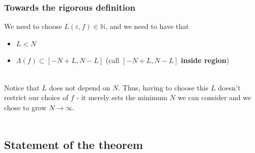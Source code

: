 \documentclass{beamer}
\begin{document}
\begin{frame}
    \frametitle{Towards the rigorous definition}
    We need to choose $L(\varepsilon, f) \in \mathbb{N}$, and we need to have that
    \begin{itemize}
        \item $L < N$
        \item $\Lambda(f) \subset [-N+L, N-L]$ (call $[-N+L, N-L]$ \textbf{inside region})
    \end{itemize}
    ~\\
     Notice that $L$ does not depend on $N$. Thus, having to choose this $L$ doesn't restrict our choice of $f$ - it merely sets the minimum
     $N$ we can consider and we chose to grow $N \rightarrow \infty$.
    \\~\\
\end{frame}

\subsection{Statement of the theorem} %
\end{document}

